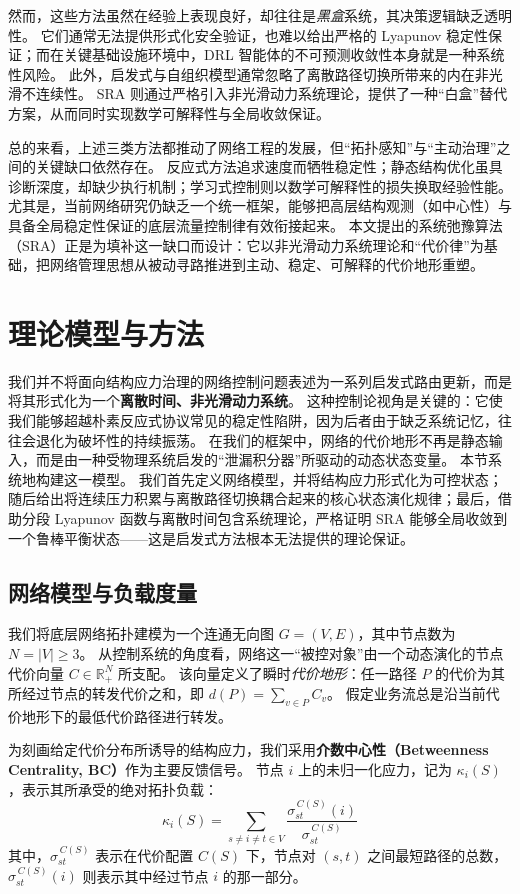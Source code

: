 \documentclass[journal]{IEEEtran}
\theoremstyle{plain}
\theoremstyle{definition}
\begin{document}
然而，这些方法虽然在经验上表现良好，却往往是\textit{黑盒}系统，其决策逻辑缺乏透明性。
它们通常无法提供形式化安全验证，也难以给出严格的 Lyapunov 稳定性保证；而在关键基础设施环境中，DRL 智能体的不可预测收敛性本身就是一种系统性风险。
此外，启发式与自组织模型通常忽略了离散路径切换所带来的内在非光滑不连续性。
SRA 则通过严格引入非光滑动力系统理论，提供了一种“白盒”替代方案，从而同时实现数学可解释性与全局收敛保证。

总的来看，上述三类方法都推动了网络工程的发展，但“拓扑感知”与“主动治理”之间的关键缺口依然存在。
反应式方法追求速度而牺牲稳定性；静态结构优化虽具诊断深度，却缺少执行机制；学习式控制则以数学可解释性的损失换取经验性能。
尤其是，当前网络研究仍缺乏一个统一框架，能够把高层结构观测（如中心性）与具备全局稳定性保证的底层流量控制律有效衔接起来。
本文提出的系统弛豫算法（SRA）正是为填补这一缺口而设计：它以非光滑动力系统理论和“代价律”为基础，把网络管理思想从被动寻路推进到主动、稳定、可解释的代价地形重塑。

\section{理论模型与方法}
\label{sec:model}

我们并不将面向结构应力治理的网络控制问题表述为一系列启发式路由更新，而是将其形式化为一个\textbf{离散时间、非光滑动力系统}。
这种控制论视角是关键的：它使我们能够超越朴素反应式协议常见的稳定性陷阱，因为后者由于缺乏系统记忆，往往会退化为破坏性的持续振荡。
在我们的框架中，网络的代价地形不再是静态输入，而是由一种受物理系统启发的“泄漏积分器”所驱动的动态状态变量。
本节系统地构建这一模型。
我们首先定义网络模型，并将结构应力形式化为可控状态；随后给出将连续压力积累与离散路径切换耦合起来的核心状态演化规律；最后，借助分段 Lyapunov 函数与离散时间包含系统理论，严格证明 SRA 能够全局收敛到一个鲁棒平衡状态——这是启发式方法根本无法提供的理论保证。

\subsection{网络模型与负载度量}

我们将底层网络拓扑建模为一个连通无向图 $G=(V,E)$，其中节点数为 $N=|V| \ge 3$。
从控制系统的角度看，网络这一“被控对象”由一个动态演化的节点代价向量 $C \in \mathbb{R}^N_+$ 所支配。
该向量定义了瞬时\textit{代价地形}：任一路径 $P$ 的代价为其所经过节点的转发代价之和，即
$d(P) = \sum_{v \in P} C_v$。
假定业务流总是沿当前代价地形下的最低代价路径进行转发。

为刻画给定代价分布所诱导的结构应力，我们采用\textbf{介数中心性（Betweenness Centrality, BC）}作为主要反馈信号。
节点 $i$ 上的未归一化应力，记为 $\kappa_i(S)$，表示其所承受的绝对拓扑负载：
\begin{equation}
    \label{eq:bc_definition}
    \kappa_i(S) = \sum_{s\neq i\neq t\in V} \frac{\sigma^{\,C(S)}_{st}(i)}{\sigma^{\,C(S)}_{st}}
\end{equation}
其中，$\sigma^{\,C(S)}_{st}$ 表示在代价配置 $C(S)$ 下，节点对 $(s,t)$ 之间最短路径的总数，$\sigma^{\,C(S)}_{st}(i)$ 则表示其中经过节点 $i$ 的那一部分。
\end{document}
